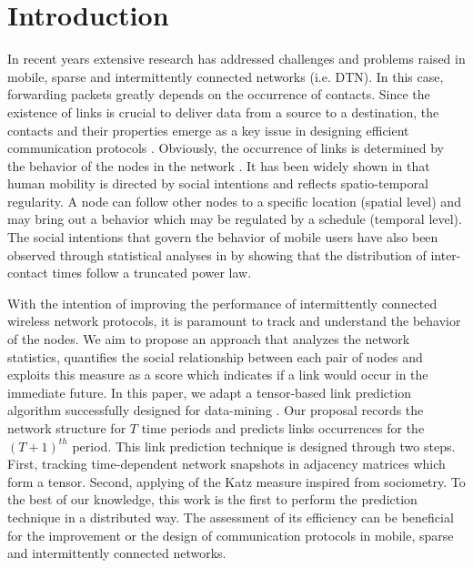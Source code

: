 \documentclass[conference]{IEEEtran}
\begin{document}
\IEEEpeerreviewmaketitle

\section{Introduction}

In recent years extensive research has addressed challenges and
problems raised in mobile, sparse and intermittently connected
networks (i.e. DTN). In this case, forwarding packets greatly
depends on the occurrence of contacts. Since the existence of links
is crucial to deliver data from a source to a destination, the
contacts and their properties emerge as a key issue in designing
efficient communication protocols \cite{Hossmann2010a}. Obviously,
the occurrence of links is determined by the behavior of the nodes
in the network \cite{Chaintreau07}. It has been widely shown in
\cite{Hsu2009a, Thakur2010} that human mobility is directed by
social intentions and reflects spatio-temporal regularity. A node
can follow other nodes to a specific location (spatial level) and
may bring out a behavior which may be regulated by a schedule
(temporal level). The social intentions that govern the behavior of
mobile users have also been observed through statistical analyses in
\cite{Chaintreau07,Karagiannis2007} by showing that the distribution
of inter-contact times follow a truncated power law.

With the intention of improving the performance of intermittently
connected wireless network protocols, it is paramount to track and
understand the behavior of the nodes. We aim to propose an approach
that analyzes the network statistics, quantifies the social
relationship between each pair of nodes and exploits this measure as
a score which indicates if a link would occur in the immediate
future. 
In this paper, we adapt a tensor-based link prediction algorithm
successfully designed for data-mining \cite{Acar2009,Dunlavy2011}.
Our proposal records the network structure for $T$ time periods and
predicts links occurrences for the $(T+1)^{th}$ period. This link
prediction technique is designed through two steps. First, tracking
time-dependent network snapshots in adjacency matrices which form a
tensor. Second, applying of the Katz measure \cite{Katz1953}
inspired from sociometry. To the best of our knowledge, this work is
the first to perform the prediction technique in a distributed way.
The assessment of its efficiency can be beneficial for the
improvement or the design of communication protocols in mobile,
sparse and intermittently connected networks.
\end{document}
